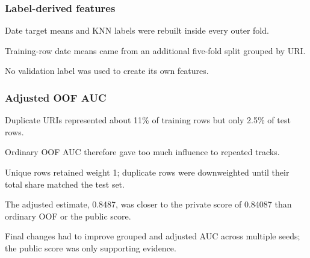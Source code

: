 \documentclass{article}
\begin{document}
\subsubsection{Label-derived features}
\begin{compactitem}
  \item Date target means and KNN labels were rebuilt inside every outer fold.
  \item Training-row date means came from an additional five-fold split
  grouped by URI.
  \item No validation label was used to create its own features.
\end{compactitem}

\subsubsection{Adjusted OOF AUC}
\begin{compactitem}
  \item Duplicate URIs represented about 11\% of training rows but only 2.5\%
  of test rows.
  \item Ordinary OOF AUC therefore gave too much influence to repeated tracks.
  \item Unique rows retained weight 1; duplicate rows were downweighted until
  their total share matched the test set.
  \item The adjusted estimate, 0.8487, was closer to the private score of
  0.84087 than ordinary OOF or the public score.
  \item Final changes had to improve grouped and adjusted AUC across multiple
  seeds; the public score was only supporting evidence.
\end{compactitem}
\end{document}
